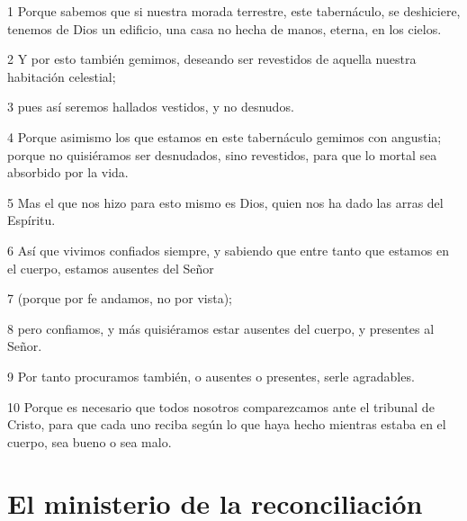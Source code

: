 \par 1 Porque sabemos que si nuestra morada terrestre, este tabernáculo, se deshiciere, tenemos de Dios un edificio, una casa no hecha de manos, eterna, en los cielos.
\par 2 Y por esto también gemimos, deseando ser revestidos de aquella nuestra habitación celestial;
\par 3 pues así seremos hallados vestidos, y no desnudos.
\par 4 Porque asimismo los que estamos en este tabernáculo gemimos con angustia; porque no quisiéramos ser desnudados, sino revestidos, para que lo mortal sea absorbido por la vida.
\par 5 Mas el que nos hizo para esto mismo es Dios, quien nos ha dado las arras del Espíritu.
\par 6 Así que vivimos confiados siempre, y sabiendo que entre tanto que estamos en el cuerpo, estamos ausentes del Señor
\par 7 (porque por fe andamos, no por vista);
\par 8 pero confiamos, y más quisiéramos estar ausentes del cuerpo, y presentes al Señor.
\par 9 Por tanto procuramos también, o ausentes o presentes, serle agradables.
\par 10 Porque es necesario que todos nosotros comparezcamos ante el tribunal de Cristo, para que cada uno reciba según lo que haya hecho mientras estaba en el cuerpo, sea bueno o sea malo.

\section*{El ministerio de la reconciliación}

